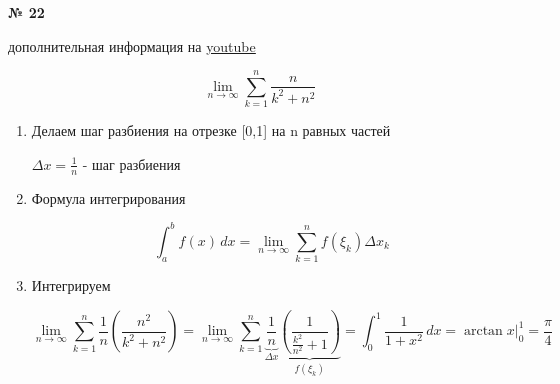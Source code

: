 \documentclass{article}
\begin{document}
\textbf{№ 22} 

\begingroup

дополнительная информация на \href{https://www.youtube.com/watch?v=PM73W4kpRL8}{\underline{youtube}}


$$ \lim_{n\to \infty} \sum_{k=1}^{n} \frac{n}{k^2+n^2} $$

\begin{enumerate}
\item Делаем шаг разбиения на отрезке [0,1] на n равных частей

$ \Delta{x}=\frac{1}{n}$ - шаг разбиения

\item Формула интегрирования

$$ \int_{a}^{b} f(x) \,dx
= \lim\limits_{n \to \infty} \sum_{k=1}^{n} f(\xi_k)\Delta{x}_k$$

\item Интегрируем

$$ \lim\limits_{n \to \infty} \sum_{k=1}^{n} \frac{1}{n}\left( \frac{n^2}{k^2+n^2} \right)
= \lim\limits_{n \to \infty} \sum_{k=1}^{n} \underbrace{\frac{1}{n}}_{\Delta{x}} 
\underbrace{\left( \frac{1}{\frac{k^2}{n^2} + 1} \right)}_{f(\xi_k)}
= \int_{0}^{1} \frac{1}{1+x^2} \,dx
= \arctan{x} \bigg\rvert_{0}^{1}
= \frac{\pi}{4}
$$

\end{enumerate}
\endgroup
\end{document}
